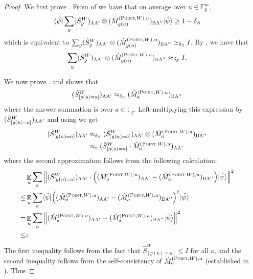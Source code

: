 \documentclass[11pt]{article}
\theoremstyle{definition}
\newcommand{\ket}[1]{|#1\rangle}
\newcommand{\bra}[1]{\langle#1|}
\newcommand{\Id}{\ensuremath{I}}
\newcommand{\F}{\ensuremath{\mathbb{F}}}
\newcommand{\eps}{\varepsilon}
\newcommand{\E}{\mathop{\mathbb{E}}\displaylimits}
\newcommand{\labelstyle}[1]{\ensuremath{\textsc{#1}}\xspace}
\newcommand{\alice}{\labelstyle{A}}
\newcommand{\bob}{\labelstyle{B}}
\newcommand{\typestyle}[1]{\ensuremath{\textsc{#1}}\xspace}
\newcommand{\Point}{\typestyle{Point}}
\begin{document}
\begin{proof}
We first prove . From  of  we have that on average over $u \in \F_q^m$,
\begin{equation}
\label{eq:qld-constructing-the-paulis-helper0}
	  \bra{\hat{\psi}} \sum_g (\hat{S}^W_g)_{\alice \alice'} \otimes (\hat{M}^{(\Point, W), u}_{g(u)})_{\bob \alice''} \ket{\hat{\psi}} \geq 1 - \delta_S
\end{equation}
which is equivalent to $\sum_g (\hat{S}^W_g)_{\alice \alice'} \otimes (\hat{M}^{(\Point, W), u}_{g(u)})_{\bob \alice''}  \simeq_{\delta_S} \Id$. By , we have that
\[
\sum_g (\hat{S}^W_g)_{\alice \alice'} \otimes (\hat{M}^{(\Point, W), u}_{g(u)})_{\bob \alice''} \approx_{\delta_S} \Id.
\]

We now prove .  and  shows that
\[ (\hat{S}^W_{[g(u)=a]})_{\alice \alice'} \approx_{\delta_S} (\hat{M}^{(\Point, W), u}_{a})_{\bob \alice''}\]
where the answer summation is over $a \in \F_q$. Left-multiplying this expression by $(\hat{S}^W_{[g(u)=a]})_{\alice \alice'}$ and using  we get
\begin{align*}
(\hat{S}^W_{[g(u)=a]})_{\alice \alice'} &\approx_{\delta_S} (\hat{S}^W_{[g(u)=a]})_{\alice \alice'} \otimes (\hat{M}^{(\Point, W), u}_{a})_{\bob \alice''} \\
&\approx_\eps (\hat{S}^W_{[g(u)=a]} \cdot \hat{M}^{(\Point, W), u}_{a})_{\alice \alice'}
\end{align*}
where the second approximation follows from the following calculation:
\begin{align}
	& \E_u \sum_a \left \| (\hat{S}^W_{[g(u)=a]})_{\alice \alice'} \cdot \Big ( (\hat{M}^{(\Point, W), u}_{a})_{\alice \alice'} - (\hat{M}^{(\Point, W), u}_{a})_{\bob \alice''} \Big ) \ket{\hat{\psi}} \right \|^2  \\
	\leq & \E_u \sum_a \bra{\hat{\psi}} \Big ( (\hat{M}^{(\Point, W), u}_{a})_{\alice \alice'} - (\hat{M}^{(\Point, W), u}_{a})_{\bob \alice''} \Big )^2 \ket{\hat{\psi}} \\
	= & \E_u \sum_a \left \| (\hat{M}^{(\Point, W), u}_{a})_{\alice \alice'} - (\hat{M}^{(\Point, W), u}_{a})_{\bob \alice''} \ket{\hat{\psi}} \right \|^2 \\
	\leq & \eps
\end{align}
The first inequality follows from the fact that $\hat{S}^W_{[g(u)=a]} \leq \Id$ for all $a$, and the second inequality follows from the self-consistency of $\hat{M}^{(\Point, W), u}_{a}$ (established in ). Thus

\end{proof}
\end{document}
